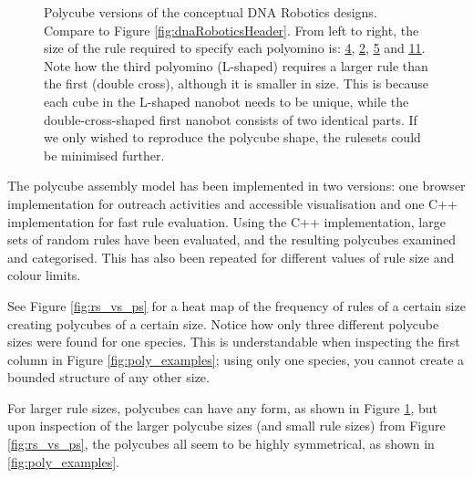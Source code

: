 \begin{figure}
\caption{Polycube versions of the conceptual DNA Robotics designs. Compare to Figure \ref{fig:dnaRoboticsHeader}. From left to right, the size of the rule required to specify each polyomino is: \href{https://akodiat.github.io/polycubes/view?hexRule=040890040707840c00000000888a00000000101400000000}{\underline{4}}, \href{https://akodiat.github.io/polycubes/view?hexRule=0a040b0b080a840e00000000}{\underline{2}}, \href{https://akodiat.github.io/polycubes/view?hexRule=06000c0b00001284000b080a0090140b00000000188c0000000014980000}{\underline{5}} and \href{https://akodiat.github.io/polycubes/view?hexRule=0406008800008400240000008c0800000000903400000000980c2f2f10129c1a0000000094000000002214141c000000000028a40000ac3200000000b43000000000}{\underline{11}}. Note how the third polyomino (L-shaped) requires a larger rule than the first (double cross), although it is smaller in size. This is because each cube in the L-shaped nanobot needs to be unique, while the double-cross-shaped first nanobot consists of two identical parts. If we only wished to reproduce the polycube shape, the rulesets could be minimised further.}
\label{fig:dnaRoboticPolycubes}\end{figure}

The polycube assembly model has been implemented in two versions: one browser implementation for outreach activities and accessible visualisation and one C++ implementation for fast rule evaluation. Using the C++ implementation, large sets of random rules have been evaluated, and the resulting polycubes examined and categorised. This has also been repeated for different values of rule size and colour limits.

See Figure \ref{fig:rs_vs_ps} for a heat map of the frequency of rules of a certain size creating polycubes of a certain size. Notice how only three different polycube sizes were found for one species. This is understandable when inspecting the first column in Figure \ref{fig:poly_examples}; using only one species, you cannot create a bounded structure of any other size.

For larger rule sizes, polycubes can have any form, as shown in Figure \ref{fig:dnaRoboticPolycubes}, but upon inspection of the larger polycube sizes (and small rule sizes) from Figure \ref{fig:rs_vs_ps}, the polycubes all seem to be highly symmetrical, as shown in \ref{fig:poly_examples}.


